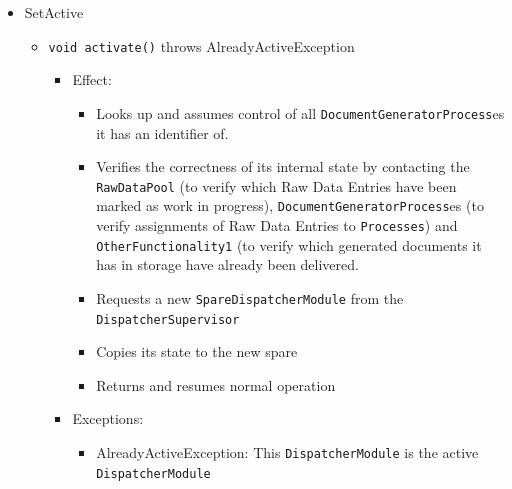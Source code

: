 \documentclass[a4paper,10pt]{article}
\begin{document}
\begin{itemize}
	\item SetActive
	\begin{itemize}
		\item \texttt{void activate()} throws AlreadyActiveException
		\begin{itemize}
			\item Effect: 
			\begin{itemize}
				\item Looks up and assumes control of all \texttt{DocumentGeneratorProcess}es it has an identifier of.
				\item Verifies the correctness of its internal state by contacting the \texttt{RawDataPool} (to verify which Raw Data Entries have been marked as work in progress), \texttt{DocumentGeneratorProcess}es (to verify assignments of Raw Data Entries to \texttt{Processes}) and \texttt{OtherFunctionality1} (to verify which generated documents it has in storage have already been delivered.
				\item Requests a new \texttt{SpareDispatcherModule} from the \texttt{DispatcherSupervisor}
				\item Copies its state to the new spare
				\item Returns and resumes normal operation
			\end{itemize}
			\item Exceptions: 
			\begin{itemize}
				\item AlreadyActiveException: This \texttt{DispatcherModule} is the active \texttt{DispatcherModule}
			\end{itemize}
		\end{itemize}
	\end{itemize}
\end{itemize}
\end{document}
